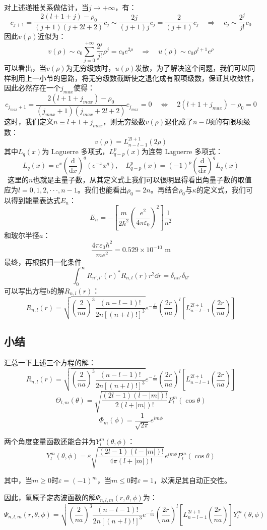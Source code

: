 对上述递推关系做估计，当$j \rightarrow +\infty$，有：
\[c_{j+1}=\frac{2(l+1+j)-\rho_0}{(j+1)(j+2l+2)}c_j \sim \frac{2j}{(j+1)j}c_j=\frac{2}{(j+1)}c_j \quad \Rightarrow \quad c_j \sim \frac{2^j}{j!}c_0\]
因此$v(\rho)$近似为：
\[v(\rho) \sim c_0\sum_{j=0}^{+\infty}\frac{2^j}{j!}\rho^j=c_0e^{2\rho} \quad \Rightarrow \quad u(\rho) \sim c_0\rho^{l+1}e^{\rho}\]
可以看出，当$v(\rho)$为无穷级数时，$u(\rho)$发散，为了解决这个问题，我们可以同样利用上一小节的思路，将无穷级数截断使之退化成有限项级数，保证其收敛性，因此必然存在一个$j_{max}$使得：
\[c_{j_{max}+1}=\frac{2(l+1+j_{max})-\rho_0}{(j_{max}+1)(j_{max}+2l+2)}c_{j_{max}}=0 \quad \Leftrightarrow \quad 2(l+1+j_{max})-\rho_0=0\]
这时，我们定义$n \equiv l+1+j_{max}$，则无穷级数$v(\rho)$退化成了$n-l$项的有限项级数：
\[v(\rho)=L_{n-l-1}^{2l+1}(2\rho)\]
其中$L_q(x)$为 Laguerre 多项式，$L_{q-p}^{p}(x)$为连带 Laguerre 多项式：
\[L_q(x)=e^x\left ( \frac{\mathrm{d}}{\mathrm{d}x} \right )^q(e^{-x}x^q), \quad L_{q-p}^{p}(x)=(-1)^p \left ( \frac{\mathrm{d}}{\mathrm{d}x} \right )^qL_q(x)\]\
这里的$n$也就是主量子数，从其定义式上我们可以很明显得看出角量子数的取值应为$l=0,1,2, \cdot\cdot\cdot ,n-1$。我们也能看出$\rho_0=2n$。再结合$\rho_0$与$\kappa$的定义式，我们可以得到能量表达式$E_n$：
\[E_n=- \left [\frac{m}{2\hbar^2} \left ( \frac{e^2}{4 \pi \varepsilon_0} \right )^2 \right ] \frac{1}{n^2}\]
和玻尔半径$a$：
\[\frac{4 \pi \varepsilon_0 \hbar^2}{me^2}=0.529 \times 10^{-10}\text{ m}\]
最终，再根据归一化条件
\[\int_0^{\infty}R_{n',l'}(r)^*R_{n,l}(r)r^2\dd{r}=\delta_{nn'}\delta_{ll'}\]
可以写出方程b的解$R_{n,l}(r)$：
\[R_{n,l}(r)=\sqrt{ \left (\frac{2}{na} \right )^3 \frac{(n-l-1)!}{2n[(n+l)!]^3}}e^{-\frac{r}{na}}\left (\frac{2r}{na} \right )^l \left [L_{n-l-1}^{2l+1} \left ( \frac{2r}{na} \right ) \right ]\]

\subsection{小结}
汇总一下上述三个方程的解：
\[R_{n,l}(r)=\sqrt{ \left (\frac{2}{na} \right )^3 \frac{(n-l-1)!}{2n[(n+l)!]^3}}e^{-\frac{r}{na}}\left (\frac{2r}{na} \right )^l \left [L_{n-l-1}^{2l+1} \left ( \frac{2r}{na} \right ) \right ]\]
\[\Theta_{l,m}(\theta)=\sqrt{\frac{(2l-1)(l-|m|)!}{2(l+|m|)!}}P^{m}_l(\cos\theta)\]
\[\varPhi_{m}(\phi)=\frac{1}{\sqrt{2\pi}}e^{im\phi}\]

两个角度变量函数还能合并为$Y_l^m(\theta,\phi)$：
\[Y_l^m(\theta,\phi)=\varepsilon \sqrt{\frac{(2l-1)(l-|m|)!}{4 \pi (l+|m|)!}}e^{im\phi}P^{m}_l(\cos\theta)\]

其中，当$m \geq 0$时$\varepsilon=(-1)^m$，当$m \leq 0$时$\varepsilon=1$，以满足其自动正交性。

因此，氢原子定态波函数的解$\varPsi_{n,l,m}(r,\theta,\phi)$为：
\[\varPsi_{n,l,m}(r,\theta,\phi)=\sqrt{ \left (\frac{2}{na} \right )^3 \frac{(n-l-1)!}{2n[(n+l)!]^3}}e^{-\frac{r}{na}}\left (\frac{2r}{na} \right )^l \left [L_{n-l-1}^{2l+1} \left ( \frac{2r}{na} \right ) \right ]Y_l^m(\theta,\phi)\]

